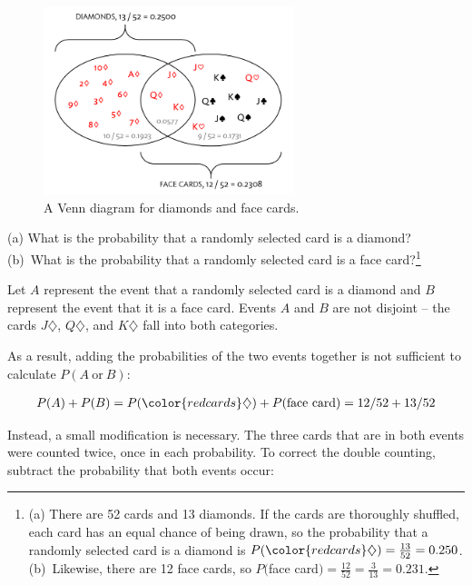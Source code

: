 \begin{figure}[h]
	\centering
	\includegraphics[width=0.65\textwidth]{ch_probability_oi_biostat/figures/cardsDiamondFaceVenn/cardsDiamondFaceVenn.png}
	\caption{A Venn diagram for diamonds and face cards.}
	\label{fig:cardsDiamondFaceVenn}
\end{figure}


\begin{exercise}
	(a) What is the probability that a randomly selected card is a diamond? (b)~What is the probability that a randomly selected card is a face card?\footnote{(a) There are 52 cards and 13 diamonds. If the cards are thoroughly shuffled, each card has an equal chance of being drawn, so the probability that a randomly selected card is a diamond is $P({\color{redcards}\diamondsuit}) = \frac{13}{52} = 0.250$. (b)~Likewise, there are 12 face cards, so $P($face card$) = \frac{12}{52} = \frac{3}{13} = 0.231$.}
\end{exercise}

Let $A$ represent the event that a randomly selected card is a diamond and $B$ represent the event that it is a face card. Events $A$ and $B$ are not disjoint -- the cards {\color{redcards}$J\diamondsuit$}, {\color{redcards}$Q\diamondsuit$}, and {\color{redcards}$K\diamondsuit$} fall into both categories. 

As a result, adding the probabilities of the two events together is not sufficient to calculate $P(A \ \text{or} \ B)$:

\begin{eqnarray*}
	P(A) + P(B) = P({\color{redcards}\diamondsuit}) + P(\text{face card}) = 12/52 + 13/52
	\label{overCountFaceDiamond}
\end{eqnarray*}

Instead, a small modification is necessary. The three cards that are in both events were counted twice, once in each probability. To correct the double counting, subtract the probability that both events occur:

